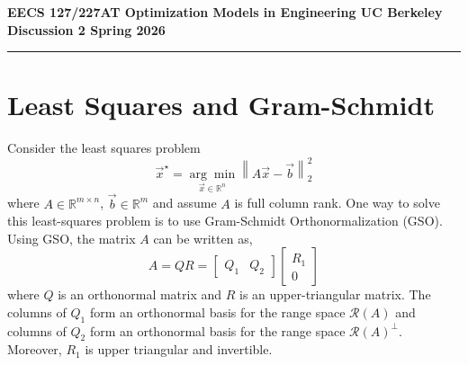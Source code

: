 \documentclass[10pt]{article}
\newcommand{\RR}{\mathbb{R}}
\newcommand{\Range}{\mathcal{R}}
\begin{document}
\begin{center}
    {\large\bfseries EECS 127/227AT \hfill Optimization Models in Engineering \hfill UC Berkeley}\\[4pt]
    {\large\bfseries Discussion 2 \hfill \hfill Spring 2026}
\end{center}

\noindent\rule{\textwidth}{0.4pt}

\section{Least Squares and Gram-Schmidt}

Consider the least squares problem
\begin{equation}
    \vec{x}^\star = \underset{\vec{x} \in \RR^n}{\arg\min} \left\| A\vec{x} - \vec{b} \right\|_2^2
\end{equation}
where $A \in \RR^{m \times n}$, $\vec{b} \in \RR^m$ and assume $A$ is full column rank. One way to solve this least-squares problem is to use Gram-Schmidt Orthonormalization (GSO). Using GSO, the matrix $A$ can be written as,
\begin{equation}
    A = QR = \begin{bmatrix} Q_1 & Q_2 \end{bmatrix} \begin{bmatrix} R_1 \\ 0 \end{bmatrix}
\end{equation}
where $Q$ is an orthonormal matrix and $R$ is an upper-triangular matrix. The columns of $Q_1$ form an orthonormal basis for the range space $\Range(A)$ and columns of $Q_2$ form an orthonormal basis for the range space $\Range(A)^\perp$. Moreover, $R_1$ is upper triangular and invertible.
\end{document}
